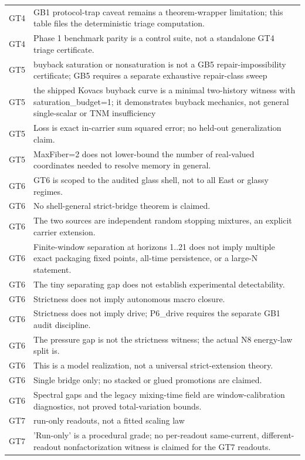 \begin{longtable}{>{\raggedright\arraybackslash}p{3.6cm}p{11.6cm}}
GT4 & GB1 protocol-trap caveat remains a theorem-wrapper limitation; this table files the deterministic triage computation. \\
GT4 & Phase 1 benchmark parity is a control suite, not a standalone GT4 triage certificate. \\
GT5 & buyback saturation or nonsaturation is not a GB5 repair-impossibility certificate; GB5 requires a separate exhaustive repair-class sweep \\
GT5 & the shipped Kovacs buyback curve is a minimal two-history witness with saturation\_budget=1; it demonstrates buyback mechanics, not general single-scalar or TNM insufficiency \\
GT5 & Loss is exact in-carrier sum squared error; no held-out generalization claim. \\
GT5 & MaxFiber=2 does not lower-bound the number of real-valued coordinates needed to resolve memory in general. \\
GT6 & GT6 is scoped to the audited glass shell, not to all East or glassy regimes. \\
GT6 & No shell-general strict-bridge theorem is claimed. \\
GT6 & The two sources are independent random stopping mixtures, an explicit carrier extension. \\
GT6 & Finite-window separation at horizons 1..21 does not imply multiple exact packaging fixed points, all-time persistence, or a large-N statement. \\
GT6 & The tiny separating gap does not establish experimental detectability. \\
GT6 & Strictness does not imply autonomous macro closure. \\
GT6 & Strictness does not imply drive; P6\_drive requires the separate GB1 audit discipline. \\
GT6 & The pressure gap is not the strictness witness; the actual N8 energy-law split is. \\
GT6 & This is a model realization, not a universal strict-extension theory. \\
GT6 & Single bridge only; no stacked or glued promotions are claimed. \\
GT6 & Spectral gaps and the legacy mixing-time field are window-calibration diagnostics, not proved total-variation bounds. \\
GT7 & run-only readouts, not a fitted scaling law \\
GT7 & 'Run-only' is a procedural grade; no per-readout same-current, different-readout nonfactorization witness is claimed for the GT7 readouts. \\

\end{longtable}
